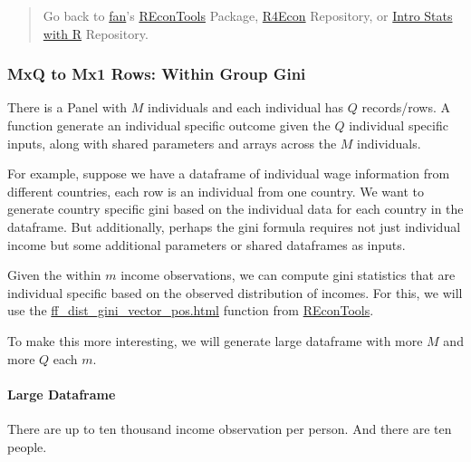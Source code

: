 \documentclass[
]{book}
\begin{document}
\begin{quote}
Go back to \href{http://fanwangecon.github.io/CodeDynaAsset/}{fan}'s \href{https://fanwangecon.github.io/REconTools/}{REconTools} Package, \href{https://fanwangecon.github.io/R4Econ/}{R4Econ} Repository, or \href{https://fanwangecon.github.io/Stat4Econ/}{Intro Stats with R} Repository.
\end{quote}

\hypertarget{mxq-to-mx1-rows-within-group-gini}{%
\subsubsection{MxQ to Mx1 Rows: Within Group Gini}\label{mxq-to-mx1-rows-within-group-gini}}

There is a Panel with \(M\) individuals and each individual has \(Q\) records/rows. A function generate an individual specific outcome given the \(Q\) individual specific inputs, along with shared parameters and arrays across the \(M\) individuals.

For example, suppose we have a dataframe of individual wage information from different countries, each row is an individual from one country. We want to generate country specific gini based on the individual data for each country in the dataframe. But additionally, perhaps the gini formula requires not just individual income but some additional parameters or shared dataframes as inputs.

Given the within \(m\) income observations, we can compute gini statistics that are individual specific based on the observed distribution of incomes. For this, we will use the \href{https://fanwangecon.github.io/REconTools/reference/ff_dist_gini_vector_pos.html}{ff\_dist\_gini\_vector\_pos.html} function from \href{https://fanwangecon.github.io/REconTools/}{REconTools}.

To make this more interesting, we will generate large dataframe with more \(M\) and more \(Q\) each \(m\).

\hypertarget{large-dataframe}{%
\paragraph{Large Dataframe}\label{large-dataframe}}

There are up to ten thousand income observation per person. And there are ten people.
\end{document}
